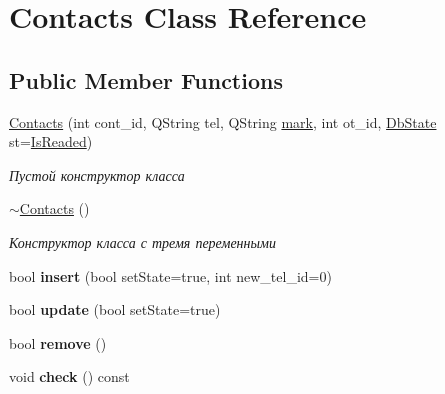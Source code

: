 \hypertarget{class_contacts}{}\section{Contacts Class Reference}
\label{class_contacts}
\subsection*{Public Member Functions}
\begin{DoxyCompactItemize}
\item 
\mbox{\label{class_contacts_ae394a4e2ca5615bdcf72c1e64035dba5}} 
\mbox{\hyperlink{class_contacts_ae394a4e2ca5615bdcf72c1e64035dba5}{Contacts}} (int cont\+\_\+id, Q\+String tel, Q\+String \mbox{\hyperlink{class_contacts_afd8d015a6fe35955cc13e845af127e9a}{mark}}, int ot\+\_\+id, \mbox{\hyperlink{___contacts_8h_ad709f09dcd44386da4fec847f603fa4c}{Db\+State}} st=\mbox{\hyperlink{___contacts_8h_ad709f09dcd44386da4fec847f603fa4ca7a5c75b2a8f2a851b0f1043a126a7cbf}{Is\+Readed}})
\begin{DoxyCompactList}\small\item\em Пустой конструктор класса \end{DoxyCompactList}\item 
\mbox{\label{class_contacts_a0ba39b3e90e0b5c4cb9a06d3ab3363a1}} 
\mbox{\hyperlink{class_contacts_a0ba39b3e90e0b5c4cb9a06d3ab3363a1}{$\sim$\+Contacts}} ()
\begin{DoxyCompactList}\small\item\em Конструктор класса с тремя переменными \end{DoxyCompactList}\item 
\mbox{\label{class_contacts_a6f3bdc9f9802afa1a27e94883d05066a}} 
bool {\bfseries insert} (bool set\+State=true, int new\+\_\+tel\+\_\+id=0)
\item 
\mbox{\label{class_contacts_a8bac7b27cc1b13267d3e0fb140f15269}} 
bool {\bfseries update} (bool set\+State=true)
\item 
\mbox{\label{class_contacts_abaa6435d8fc9fe60511a265cacf25bd4}} 
bool {\bfseries remove} ()
\item 
\mbox{\label{class_contacts_a504831672fcf3af36168df1fdd230b36}} 
void {\bfseries check} () const
\end{DoxyCompactItemize}
